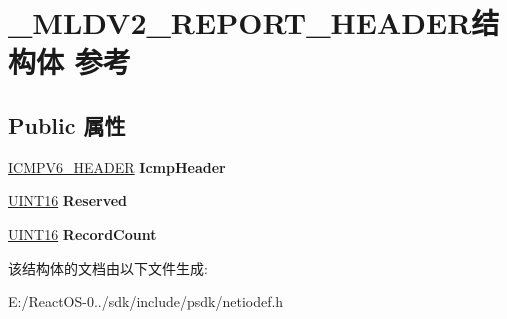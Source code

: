 \hypertarget{struct___m_l_d_v2___r_e_p_o_r_t___h_e_a_d_e_r}{}\section{\+\_\+\+M\+L\+D\+V2\+\_\+\+R\+E\+P\+O\+R\+T\+\_\+\+H\+E\+A\+D\+E\+R结构体 参考}
\label{struct___m_l_d_v2___r_e_p_o_r_t___h_e_a_d_e_r}
\subsection*{Public 属性}
\begin{DoxyCompactItemize}
\item 
\mbox{\label{struct___m_l_d_v2___r_e_p_o_r_t___h_e_a_d_e_r_a9af2f9b7bd0c587aa6348c0fe9ce1fce}} 
\hyperlink{struct_i_c_m_p___h_e_a_d_e_r}{I\+C\+M\+P\+V6\+\_\+\+H\+E\+A\+D\+ER} {\bfseries Icmp\+Header}
\item 
\mbox{\label{struct___m_l_d_v2___r_e_p_o_r_t___h_e_a_d_e_r_a28b8fdbb0c940f25f6a94bd08a2b7efa}} 
\hyperlink{_processor_bind_8h_a09f1a1fb2293e33483cc8d44aefb1eb1}{U\+I\+N\+T16} {\bfseries Reserved}
\item 
\mbox{\label{struct___m_l_d_v2___r_e_p_o_r_t___h_e_a_d_e_r_a9af7e134b543628b9735fe943dcbd4a5}} 
\hyperlink{_processor_bind_8h_a09f1a1fb2293e33483cc8d44aefb1eb1}{U\+I\+N\+T16} {\bfseries Record\+Count}
\end{DoxyCompactItemize}


该结构体的文档由以下文件生成\+:\begin{DoxyCompactItemize}
\item 
E\+:/\+React\+O\+S-\/0../sdk/include/psdk/netiodef.\+h\end{DoxyCompactItemize}
